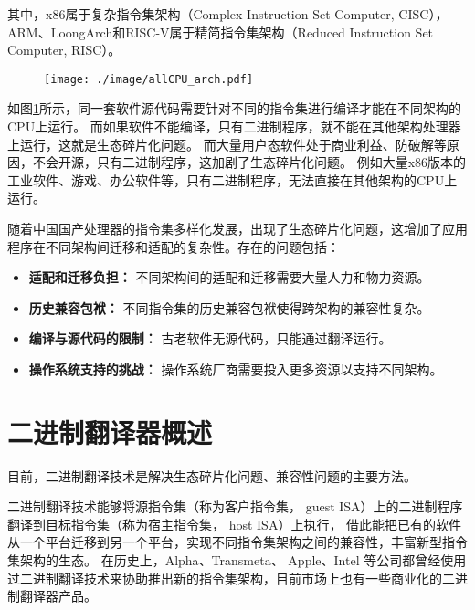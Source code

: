 其中，x86属于复杂指令集架构（Complex Instruction Set Computer, CISC），
ARM、LoongArch和RISC-V属于精简指令集架构（Reduced Instruction Set Computer, RISC）。

\begin{figure}[!htbp]
    \centering
    \texttt{[image: ./image/allCPU\_arch.pdf]}
    \label{img:allCPU_arch}
  \end{figure}


如图\ref{img:allCPU_arch}所示，同一套软件源代码需要针对不同的指令集进行编译才能在不同架构的CPU上运行\footnotemark。
而如果软件不能编译，只有二进制程序，就不能在其他架构处理器上运行，这就是生态碎片化问题。
而大量用户态软件处于商业利益、防破解等原因，不会开源，只有二进制程序，这加剧了生态碎片化问题。
例如大量x86版本的工业软件、游戏、办公软件等，只有二进制程序，无法直接在其他架构的CPU上运行。


随着中国国产处理器的指令集多样化发展，出现了生态碎片化问题，这增加了应用程序在不同架构间迁移和适配的复杂性。存在的问题包括：
    \begin{itemize}
    \item \textbf{适配和迁移负担：} 不同架构间的适配和迁移需要大量人力和物力资源。
    
    \item \textbf{历史兼容包袱：} 不同指令集的历史兼容包袱使得跨架构的兼容性复杂。
    
    \item \textbf{编译与源代码的限制：} 古老软件无源代码，只能通过翻译运行。
    
    \item \textbf{操作系统支持的挑战：} 操作系统厂商需要投入更多资源以支持不同架构。
    \end{itemize}

\section{二进制翻译器概述}
目前，二进制翻译技术是解决生态碎片化问题、兼容性问题的主要方法。

二进制翻译技术能够将源指令集（称为客户指令集， guest ISA）上的二进制程序翻译到目标指令集（称为宿主指令集， host ISA）上执行，
借此能把已有的软件从一个平台迁移到另一个平台，实现不同指令集架构之间的兼容性，丰富新型指令集架构的生态。
在历史上，Alpha\cite{chernoffFX32Profiledirected1998}、Transmeta\cite{dehnertTransmetaCodeMorphing2003}、
Apple\cite{RunningIntelBinaries}、Intel\cite{noauthor_intel_nodate}
等公司都曾经使用过二进制翻译技术来协助推出新的指令集架构，目前市场上也有一些商业化的二进制翻译器产品。

